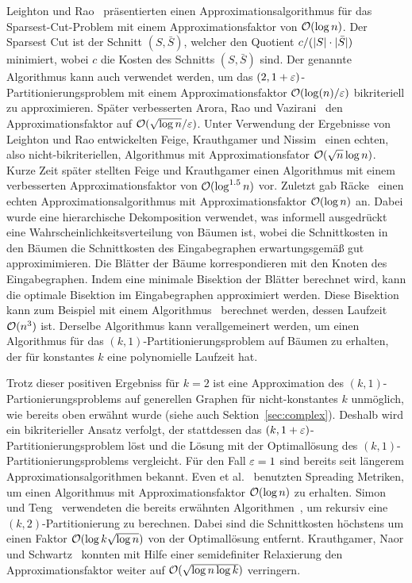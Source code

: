 Leighton und Rao~\cite{LR99} präsentierten einen Approximationsalgorithmus für das Sparsest-Cut-Problem mit einem Approximationsfaktor von $\mathcal{O}(\log n)$.
Der Sparsest Cut ist der Schnitt $(S, \bar{S})$, welcher den Quotient $c/(\lvert S\rvert \cdot  \lvert\bar{S}\rvert)$ minimiert, wobei $c$ die Kosten des Schnitts $(S, \bar{S})$ sind.
Der genannte Algorithmus kann auch verwendet werden, um das $(2, 1 + \varepsilon)$\hyp Partitionierungsproblem mit einem Approximationsfaktor $\mathcal{O}(\log(n)/\varepsilon)$ bikriteriell zu approximieren.
Später verbesserten Arora, Rao und Vazirani~\cite{ARV09} den Approximationsfaktor auf $\mathcal{O}(\sqrt{\log n}/\varepsilon)$.
Unter Verwendung der Ergebnisse von Leighton und Rao entwickelten Feige, Krauthgamer und Nissim~\cite{FKN00} einen echten, also nicht-bikriteriellen, Algorithmus mit Approximationsfator $\mathcal{O}(\sqrt{n} \log n)$.
Kurze Zeit später stellten Feige und Krauthgamer einen Algorithmus mit einem verbesserten Approximationsfaktor von $\mathcal{O}(\log^{1.5} n)$ vor.
Zuletzt gab Räcke~\cite{rc08} einen echten Approximationsalgorithmus mit Approximationsfaktor $\mathcal{O}(\log n)$ an.
Dabei wurde eine hierarchische Dekomposition verwendet, was informell ausgedrückt eine Wahrscheinlichkeitsverteilung von Bäumen ist, wobei die Schnittkosten in den Bäumen die Schnittkosten des Eingabegraphen erwartungsgemäß gut approximimieren.
Die Blätter der Bäume korrespondieren mit den Knoten des Eingabegraphen.
Indem eine minimale Bisektion der Blätter berechnet wird, kann die optimale Bisektion im Eingabegraphen approximiert werden.
Diese Bisektion kann zum Beispiel mit einem Algorithmus~\cite{mcg78, ws11} berechnet werden, dessen Laufzeit $\mathcal{O}(n^3)$ ist.
Derselbe Algorithmus kann verallgemeinert werden, um einen Algorithmus für das $(k, 1)$\hyp Partitionierungsproblem auf Bäumen zu erhalten, der für konstantes $k$ eine polynomielle Laufzeit hat.

Trotz dieser positiven Ergebniss für $k=2$ ist eine Approximation des $(k, 1)$\hyp Partionierungsproblems auf generellen Graphen für nicht-konstantes $k$ unmöglich, wie bereits oben erwähnt wurde (siehe auch Sektion~\ref{sec:complex}).
Deshalb wird ein bikriterieller Ansatz verfolgt, der stattdessen das $(k,1+\varepsilon)$\hyp Partitionierungsproblem löst und die Lösung mit der Optimallösung des $(k, 1)$\hyp Partitionierungsproblems vergleicht.
Für den Fall $\varepsilon = 1$ sind bereits seit längerem Approximationsalgorithmen bekannt.
Even et al.~\cite{ENR+97} benutzten Spreading Metriken, um einen Algorithmus mit Approximationsfaktor $\mathcal{O}(\log n)$ zu erhalten.
Simon und Teng~\cite{ST97} verwendeten die bereits erwähnten Algorithmen~\cite{LR99, ARV09}, um rekursiv eine $(k, 2)$\hyp Partitionierung zu berechnen.
Dabei sind die Schnittkosten höchstens um einen Faktor $\mathcal{O}(\log k \sqrt{\log n})$ von der Optimallösung entfernt.
Krauthgamer, Naor und Schwartz~\cite{KNS09} konnten mit Hilfe einer semidefiniter Relaxierung den Approximationsfaktor weiter auf $\mathcal{O}(\sqrt{\log n \log k})$ verringern.

